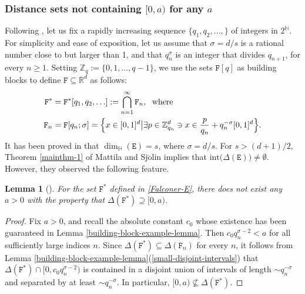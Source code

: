 \documentclass[a4paper,11pt]{amsart}
\newtheorem{lem}[thm]{\bf Lemma}
\numberwithin{equation}{section}
\begin{document}
\subsubsection{Distance sets not containing $[0, a)$ for any $a$} \label{Appendix-2} 

Following \cite{Falconer-1986}, let us fix a rapidly increasing sequence $\{q_1, q_2, \ldots, \}$ of integers in $2^{\mathbb N}$. For simplicity and ease of exposition, let us assume that $\sigma = d/s$ is a rational number close to but larger than 1, and that $q_{n}^{\sigma}$ is an integer that divides $q_{n+1}$, for every $n \geq 1$. Setting $\mathbb Z_{q} := \{0, 1, \ldots, q - 1\}$, we use the sets $\mathtt F[q]$ as building blocks to define $\mathtt F \subseteq \mathbb R^d$ as follows: 
\begin{align} \label{Falconer-E-original} \mathtt F^{\ast} &= \mathtt F^{\ast}[q_1, q_2, \ldots] := \bigcap_{n=1}^{\infty} \mathtt F_n, \; \text{ where }  \\ \mathtt F_n &= \mathtt F[q_n; \sigma] = \Bigl\{x \in [0,1]^d \bigl| \exists p \in \mathbb Z_{q_n}^d \ni x \in \frac{p}{q_n} + q_n^{-\sigma}[0,1]^d  \Bigr\}. \label{Falconer-F-original}
\end{align}  
It has been proved in \cite[Section 8.5]{Falconer-Book-GFS} that $\dim_{\mathbb H}(\mathtt E) = s$, where $\sigma = d/s$.  
 For $s > (d+1)/2$, Theorem \ref{mainthm-1} of Mattila and Sj$\ddot{\text{o}}$lin implies that $\text{int}\bigl(\Delta(\mathtt E) \bigr) \ne \emptyset$. However, they observed the following feature. 
\begin{lem}[\cite{{Mattila-Sjolin-99},{Falconer-1986}}] \label{distance-counterexample-lemma}
For the set $\mathtt F^{\ast}$ defined in \eqref{Falconer-E}, there does not exist any $a > 0$ with the property that $\Delta(\mathtt F^{\ast}) \supseteq [0, a)$.  
\end{lem} 
\begin{proof}
Fix $a > 0$, and recall the absolute constant $c_0$ whose existence has been guaranteed in Lemma \ref{building-block-example-lemma}. Then $c_0 q_n^{\sigma-2} < a$ for all sufficiently large indices $n$. Since $\Delta(\mathtt F^{\ast}) \subseteq \Delta(\mathtt F_n)$ for every $n$, it follows from Lemma \ref{building-block-example-lemma}(\ref{small-disjoint-intervals}) that $\Delta(\mathtt F^{\ast}) \cap [0, c_0 q_n^{\sigma -2})$ is contained in a disjoint union of intervals of length $\sim q_n^{-\sigma}$ and separated by at least $\sim q_n^{-\sigma}$. In particular, $[0, a) \not\subseteq \Delta(\mathtt F^{\ast})$.
\end{proof}   
\end{document}
